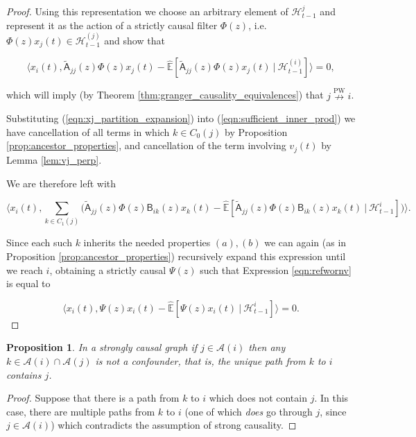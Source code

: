 \documentclass{statsoc}
\def\npwgc{\overset{\text{PW}}{\nrightarrow}}  %
\def\B{\mathsf{B}}  %
\def\A{\mathsf{A}}  %
\def\H{\mathcal{H}}  %
\newcommand{\linE}[2]{\hat{\E}[#1\ |\ #2]}  %
\newcommand{\anc}[1]{\mathcal{A}(#1)}  %
\newtheorem{proposition}{Proposition}
\def\H{\mathcal{H}}  %
\def\E{\mathbb{E}}  %
\newcommand{\inner}[2]{\langle #1, #2 \rangle}  %
\begin{document}
\begin{proof}
  Using this representation we choose an arbitrary element of
  $\H_{t - 1}^j$ and represent it as the action of a strictly causal
  filter $\Phi(z)$, i.e.  $\Phi(z) x_j(t) \in \H_{t - 1}^{(j)}$ and show that

  \begin{equation}
    \label{eqn:sufficient_inner_prod}
    \inner{x_i(t)}{\widetilde{\A}_{jj}(z)\Phi(z)x_j(t) - \linE{\widetilde{\A}_{jj}(z)\Phi(z)x_j(t)}{\H_{t - 1}^{(i)}}} = 0,
  \end{equation}

  which will imply (by Theorem
  \ref{thm:granger_causality_equivalences}) that $j \npwgc i$.

  Substituting (\ref{eqn:xj_partition_expansion}) into
  (\ref{eqn:sufficient_inner_prod}) we have cancellation of all terms
  in which $k \in C_0(j)$ by Proposition \ref{prop:ancestor_properties},
  and cancellation of the term involving $v_j(t)$ by Lemma \ref{lem:vj_perp}.

  We are therefore left with

  \begin{equation}
    \label{eqn:refwornv}  %
    \inner{x_i(t)}{\sum_{k \in C_1(j)} \big(\widetilde{\A}_{jj}(z)\Phi(z) \B_{ik}(z)x_k(t) - \linE{\widetilde{\A}_{jj}(z)\Phi(z) \B_{ik}(z)x_k(t)}{\H_{t - 1}^i}\big)}.
  \end{equation}

  Since each such $k$ inherits the needed properties $(a), (b)$ we can
  again (as in Proposition \ref{prop:ancestor_properties}) recursively
  expand this expression until we reach $i$, obtaining a strictly
  causal $\Psi(z)$ such that Expression \eqref{eqn:refwornv} is equal to

  \begin{equation}
    \inner{x_i(t)}{\Psi(z)x_i(t) - \linE{\Psi(z)x_i(t)}{\H_{t - 1}^i}} = 0.
  \end{equation}
\end{proof}

\begin{proposition}
  \label{prop:sc_graph_common_anc}
  In a strongly causal graph if $j \in \anc{i}$ then any
  $k \in \anc{i} \cap \anc{j}$ is not a confounder, that is,
  the unique path from $k$ to $i$ contains $j$.
\end{proposition}
\begin{proof}
  Suppose that there is a path from $k$ to $i$ which does not contain
  $j$.  In this case, there are multiple paths from $k$ to $i$ (one of
  which \textit{does} go through $j$, since $j \in \anc{i}$) which
  contradicts the assumption of strong causality.
\end{proof}
\end{document}

